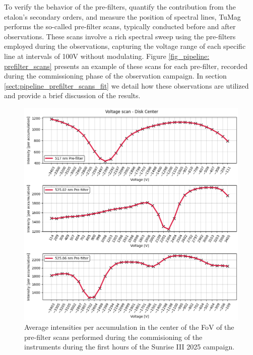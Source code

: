 To verify the behavior of the pre-filters, quantify the contribution from the etalon’s secondary orders, and measure the position of spectral lines, TuMag performs the so-called pre-filter scans, typically conducted before and after observations. These scans involve a rich spectral sweep using the pre-filters employed during the observations, capturing the voltage range of each specific line at intervals of 100V without modulating. Figure \ref{fig_pipeline: prefilter_scans} presents an example of these scans for each pre-filter, recorded during the commissioning phase of the observation campaign. In section \ref{sect:pipeline_prefilter_scans_fit} we detail how these observations are utilized and provide a brief discussion of the results.


\begin{figure}[t]
    \begin{minipage}[c]{0.67\textwidth}
      \includegraphics[width=\textwidth]{figures/Pipeline/Prefilter_scans.png}
    \end{minipage}\hfill
    \begin{minipage}[c]{0.29\textwidth}
      \caption[Average intensities measured for each pre-filter.]{
       Average intensities per accumulation in the center of the FoV of the pre-filter scans performed during the commisioning of the instruments during the first hours of the Sunrise III 2025 campaign.  
       \label{fig_pipeline:  prefilter_scans}
      } 
    \end{minipage}
  \end{figure}


